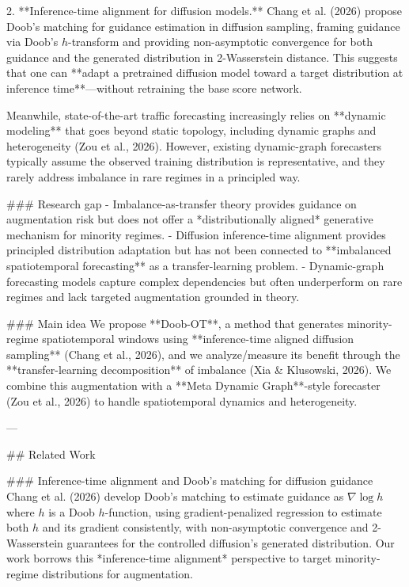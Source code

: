 2. **Inference-time alignment for diffusion models.** Chang et al. (2026) propose Doob’s matching for guidance estimation in diffusion sampling, framing guidance via Doob’s \(h\)-transform and providing non-asymptotic convergence for both guidance and the generated distribution in 2-Wasserstein distance. This suggests that one can **adapt a pretrained diffusion model toward a target distribution at inference time**—without retraining the base score network.

Meanwhile, state-of-the-art traffic forecasting increasingly relies on **dynamic modeling** that goes beyond static topology, including dynamic graphs and heterogeneity (Zou et al., 2026). However, existing dynamic-graph forecasters typically assume the observed training distribution is representative, and they rarely address imbalance in rare regimes in a principled way.

### Research gap  
- Imbalance-as-transfer theory provides guidance on augmentation risk but does not offer a *distributionally aligned* generative mechanism for minority regimes.  
- Diffusion inference-time alignment provides principled distribution adaptation but has not been connected to **imbalanced spatiotemporal forecasting** as a transfer-learning problem.  
- Dynamic-graph forecasting models capture complex dependencies but often underperform on rare regimes and lack targeted augmentation grounded in theory.

### Main idea  
We propose **Doob-OT**, a method that generates minority-regime spatiotemporal windows using **inference-time aligned diffusion sampling** (Chang et al., 2026), and we analyze/measure its benefit through the **transfer-learning decomposition** of imbalance (Xia & Klusowski, 2026). We combine this augmentation with a **Meta Dynamic Graph**-style forecaster (Zou et al., 2026) to handle spatiotemporal dynamics and heterogeneity.

---

## Related Work  

### Inference-time alignment and Doob’s matching for diffusion guidance  
Chang et al. (2026) develop Doob’s matching to estimate guidance as \(\nabla \log h\) where \(h\) is a Doob \(h\)-function, using gradient-penalized regression to estimate both \(h\) and its gradient consistently, with non-asymptotic convergence and 2-Wasserstein guarantees for the controlled diffusion’s generated distribution. Our work borrows this *inference-time alignment* perspective to target minority-regime distributions for augmentation.

